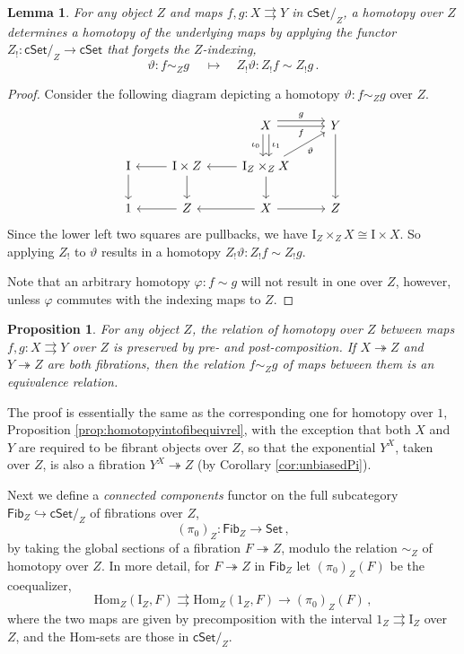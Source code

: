 \documentclass[11pt,reqno]{amsart}
\newcommand{\Set}{\ensuremath{\mathsf{Set}}}
\newcommand{\cSet}{\ensuremath{\mathsf{cSet}}}
\newcommand{\cSetZ}{\ensuremath{\mathsf{cSet}/_{\!Z}}}
\newcommand{\hook}{\ensuremath{\hookrightarrow}}
\newcommand{\ra}{\ensuremath{\rightarrow}}
\newcommand{\fib}{\ensuremath{\twoheadrightarrow}}
\renewcommand{\to}{\ensuremath{\rightarrow}}
\newcommand{\Hom}{\ensuremath{\mathrm{Hom}}}
\renewcommand{\hom}{\ensuremath{\mathrm{Hom}}}
\newcommand{\I}{\ensuremath{\mathrm{I}}}
\newcommand{\Fib}{\ensuremath{\mathsf{Fib}}}
\newtheorem{proposition}[theorem]{Proposition}
\newtheorem{lemma}[theorem]{Lemma}
\theoremstyle{remark}
\theoremstyle{definition}
\begin{document}
\begin{lemma}\label{lem:homotopyinthesliceishomotopy}
For any object $Z$ and maps $f, g: X\rightrightarrows Y$ in $\cSetZ$, a homotopy over $Z$ determines a homotopy of the underlying maps by applying the functor $Z_! : \cSetZ \to \cSet$ that forgets the $Z$-indexing,
\[
\vartheta : f\sim_Z g \quad\ \mapsto\quad  Z_! \vartheta : Z_! f\sim Z_! g\,.
\]
\end{lemma}
\begin{proof} 
 Consider the following diagram depicting a homotopy $\vartheta : f\sim_Z g$ over $Z$. 
\[\begin{tikzcd}
&& X  \ar[d, shift left, "\iota_1"] \ar[d, shift right, swap,  "\iota_0"] \ar[r,swap, "f"] \ar[r, shift left=1ex, "g"] & Y \ar[dd] \\  
\I \ar[d]  & \ar[l]  \I \times Z \ar[d] &  \ar[l]   \I_Z \times_Z X  \ar[d] \ar[ru,swap, "\vartheta"] &  \\
1 & Z\ar[l] & \ar[l] X  \ar[r] & Z
 \end{tikzcd}\]
 Since the lower left two squares are pullbacks, we have $\I_Z \times_Z X \cong \I\times X$. So applying $Z_!$ to $\vartheta$ results in a homotopy $Z_!\vartheta : Z_! f \sim Z_!g$.
 
Note that an arbitrary homotopy $\varphi : f \sim  g$ will not result in one over $Z$, however, unless $\varphi$ commutes with the indexing maps to $Z$.
\end{proof}

\begin{proposition}\label{prop:homotopybetweenfibequivrel}
For any object $Z$, the relation of homotopy over $Z$ between maps $f, g: X\rightrightarrows Y$ over $Z$ is preserved by pre- and post-composition. If $X\fib Z$ and $Y\fib Z$ are both fibrations, then the relation $f \sim_Z g$ of maps between them is an equivalence relation.
\end{proposition}

The proof is essentially the same as the corresponding one for homotopy over $1$, Proposition \ref{prop:homotopyintofibequivrel}, with the exception that both $X$ and $Y$ are required to be fibrant objects over $Z$, so that the exponential $Y^X$, taken over $Z$, is also a fibration $Y^X  \fib Z$ (by Corollary \ref{cor:unbiasedPi}).

Next we define a \emph{connected components} functor on the full subcategory $\Fib_Z \hook \cSetZ$ of fibrations over $Z$,
\[
(\pi_0)_Z : \Fib_Z \ra\Set\,,
\]
by taking the global sections of a fibration $F\fib Z$, modulo the relation $\sim_Z$ of homotopy over $Z$. In more detail,  for $F\fib Z$ in $\Fib_Z$ let $(\pi_0)_Z(F)$ be the coequalizer,
\begin{equation}\label{eq:coeqpi0}
\Hom_Z(\I_Z , F) \rightrightarrows \Hom_Z(1_Z , F) \to (\pi_0)_Z(F) \,,
\end{equation}
where the two maps are given by precomposition with the interval $1_Z \rightrightarrows \I_Z$ over $Z$, and the $\hom$-sets are those in $\cSetZ$.
\end{document}
